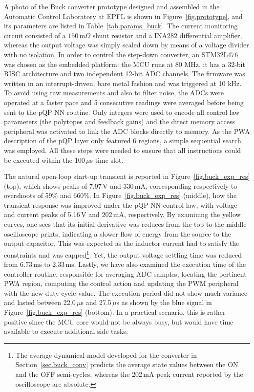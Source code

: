 A photo of the Buck converter prototype designed and assembled in the Automatic Control Laboratory at EPFL is shown in Figure~\ref{fig.prototype}, and its parameters are listed in Table~\ref{tab.params_buck}. The current monitoring circuit consisted of a $150\,$m$\Omega$ shunt resistor and a INA282 differential amplifier, whereas the output voltage was simply scaled down by means of a voltage divider with no isolation. In order to control the step-down converter, an STM32L476 was chosen as the embedded platform: the MCU runs at 80 MHz, it has a 32-bit RISC architecture and two independent 12-bit ADC channels. The firmware was written in an interrupt-driven, bare metal fashion and was triggered at 10 kHz. To avoid using raw measurements and also to filter noise, the ADCs were operated at a faster pace and 5 consecutive readings were averaged before being sent to the pQP NN routine. Only integers were used to encode all control law parameters (the polytopes and feedback gains) and the direct memory access peripheral was activated to link the ADC blocks directly to memory. As the PWA description of the pQP layer only featured 6 regions, a simple sequential search was employed. All these steps were needed to ensure that all instructions could be executed within the 100$\,\mu$s time slot.

The natural open-loop start-up transient is reported in Figure~\ref{fig.buck_exp_res} (top), which shows peaks of 7.97$\,$V and 330$\,$mA, corresponding respectively to overshoots of 59\% and 660\%. In Figure~\ref{fig.buck_exp_res} (middle), how the transient response was improved under the pQP NN control law, with voltage and current peaks of 5.16$\,$V and 202$\,$mA, respectively. By examining the yellow curves, one sees that its initial derivative was reduces from the top to the middle oscilloscope prints, indicating a slower flow of energy from the source to the output capacitor. This was expected as the inductor current had to satisfy the constraints and was capped\footnote{The average dynamical model developed for the converter in Section~\ref{sec.buck_conv} predicts the average state values between the ON and the OFF semi-cycles, whereas the 202$\,$mA peak current reported by the oscilloscope are absolute.}. Yet, the output voltage settling time was reduced from 6.73$\,$ms to 2.33$\,$ms. Lastly, we have also examined the execution time of the controller routine, responsible for averaging ADC samples, locating the pertinent PWA region, computing the control action and updating the PWM peripheral with the new duty cycle value. The execution period did not show much variance and lasted between 22.0$\,\mu$s and 27.5$\,\mu$s as shown by the blue signal in Figure~\ref{fig.buck_exp_res} (bottom). In a practical scenario, this is rather positive since the MCU core would not be always
busy, but would have time available to execute additional side tasks.

